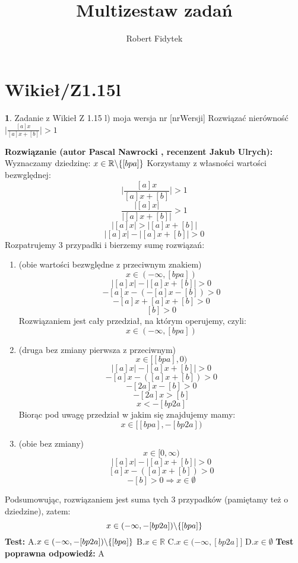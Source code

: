 \documentclass[12pt, a4paper]{article}
\title{Multizestaw zadań}
\author{Robert Fidytek}
\date{}
\theoremstyle{definition} %
\newtheorem{zad}{}
\newcommand{\kategoria}[1]{\section{#1}} %
\newcommand{\zadStart}[1]{\begin{zad}#1\newline} %
\newcommand{\zadStop}{\end{zad}}   %
\newcommand{\rozwStart}[2]{\noindent \textbf{Rozwiązanie (autor #1 , recenzent #2): }\newline} %
\newcommand{\odpStop}{\newline}                                             %
\newcommand{\testStart}{\noindent \textbf{Test:}\newline} %
\newcommand{\testStop}{\newline} %
\newcommand{\kluczStart}{\noindent \textbf{Test poprawna odpowiedź:}\newline} %
\newcommand{\kluczStop}{\newline} %
\begin{document}
\maketitle



\kategoria{Wikieł/Z1.15l}
\zadStart{Zadanie z Wikieł Z 1.15 l) moja wersja nr [nrWersji]}
Rozwiązać nierówność $\big|\frac{[a]x}{[a]x+[b]}\big|>1$
\zadStop
\rozwStart{Pascal Nawrocki}{Jakub Ulrych}
Wyznaczamy dziedzinę: $x\in\mathbb{R}\symbol{92}\{[bpa]\}$
Korzystamy z własności wartości bezwględnej:
$$\big|\frac{[a]x}{[a]x+[b]}\big|>1$$
$$\frac{|[a]x|}{|[a]x+[b]|}>1$$
$$|[a]x|>|[a]x+[b]|$$
$$|[a]x|-|[a]x+[b]|>0$$
Rozpatrujemy 3 przypadki i bierzemy sumę rozwiązań:
\begin{enumerate}
\item (obie wartości bezwględne z przeciwnym znakiem) $$x\in(-\infty,[bpa])$$ 
$$|[a]x|-|[a]x+[b]|>0$$
$$-[a]x-(-[a]x-[b])>0$$
$$-[a]x+[a]x+[b]>0$$
$$[b]>0$$
Rozwiązaniem jest cały przedział, na którym operujemy, czyli:
$$x\in(-\infty,[bpa])$$
\item (druga bez zmiany pierwsza z przeciwnym)$$x\in[[bpa],0)$$ 
$$|[a]x|-|[a]x+[b]|>0$$
$$-[a]x-([a]x+[b])>0$$
$$-[2a]x-[b]>0$$
$$-[2a]x>[b]$$
$$x<-[bp2a]$$
Biorąc pod uwagę przedział w jakim się znajdujemy mamy:
$$x\in[[bpa],-[bp2a])$$
\item (obie bez zmiany) $$x\in[0,\infty)$$ 
$$|[a]x|-|[a]x+[b]|>0$$
$$[a]x-([a]x+[b])>0$$
$$-[b]>0\Rightarrow x\in\emptyset$$
\end{enumerate}
Podsumowując, rozwiązaniem jest suma tych 3 przypadków (pamiętamy też o dziedzine), zatem: $$x\in(-\infty,-[bp2a])\symbol{92}\{[bpa]\}$$
\odpStop
\testStart
A.$x\in(-\infty,-[bp2a])\symbol{92}\{[bpa]\}$
B.$x\in\mathbb{R}$
C.$x\in(-\infty,[bp2a]]$
D.$x\in\emptyset$
\testStop
\kluczStart
A
\kluczStop
\end{document}
